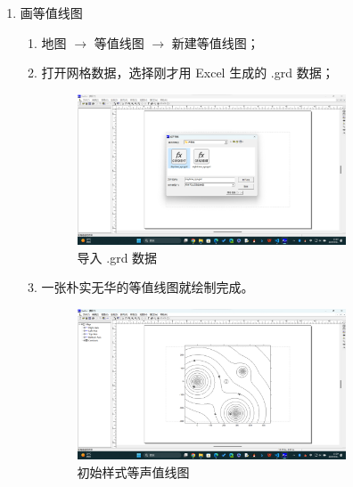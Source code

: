 \begin{enumerate}
    \item 画等值线图
    \begin{enumerate}[label=\arabic*)]
        \item 地图 $\rightarrow $ 等值线图 $\rightarrow $ 新建等值线图；
        \item 打开网格数据，选择刚才用 Excel 生成的 .grd 数据；
        \begin{figure}[H]
            \centering
            \includegraphics[width=0.8\textwidth]{figures/Sufer_step2-1.png}
            \caption{导入 .grd 数据}
        \end{figure}
        \item 一张朴实无华的等值线图就绘制完成。
        \begin{figure}[H]
            \centering
            \includegraphics[width=0.8\textwidth]{figures/Sufer_step2-2.png}
            \caption{初始样式等声值线图}
        \end{figure}
    \end{enumerate}


\end{enumerate}
